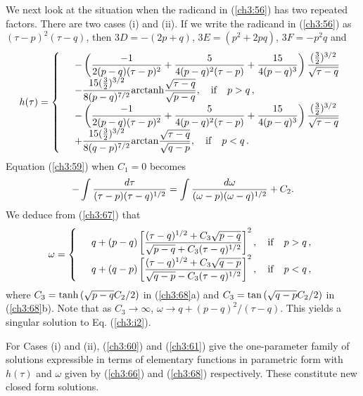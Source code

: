 We next look at the situation when the radicand in (\ref{ch3:56}) has two repeated factors. There are two
cases (i) and (ii). If we write the radicand in (\ref{ch3:56}) as $(\tau-p)^2(\tau-q)$, then $3D=-(2p+q)$,
$3E=(p^2+2pq)$, $3F=-p^2q$ and 
\begin{equation}\label{ch3:66}
h(\tau)=\left \{  \begin{array}{ll} 
&\displaystyle -\left({-1\over 2(p-q)(\tau-p)^2}+{5\over 4(p-q)^2(\tau-p)}+{15\over 4(p-q)^3}\right){(\frac32)^{3/2}\over
\sqrt{\tau-q}}\\
&- \displaystyle{15(\frac32)^{3/2}\over 8(p-q)^{7/2}}{\rm arctanh} {\sqrt{\tau-q}\over \sqrt{p-q}}, \quad {\rm if}\quad p>q\,,\\
&\displaystyle -\left({-1\over 2(p-q)(\tau-p)^2}+{5\over 4(p-q)^2(\tau-p)}+{15\over 4(p-q)^3}\right){(\frac32)^{3/2}\over
\sqrt{\tau-q}}\\
& +\displaystyle{15(\frac32)^{3/2}\over 8(q-p)^{7/2}}{\rm arctan} {\sqrt{\tau-q}\over \sqrt{q-p}}, \quad {\rm if}\quad p<q\,.
\end{array}\right.
\end{equation}
Equation (\ref{ch3:59}) when $C_1=0$ becomes
\begin{equation}
-\int {d\tau\over (\tau-p)(\tau-q)^{1/2}}=\int\displaystyle {d\omega\over (\omega-p)(\omega-q)^{1/2}}+C_2.\label{ch3:67}
\end{equation}
We deduce from (\ref{ch3:67}) that 
\begin{equation}\label{ch3:68}
\omega=\left \{  \begin{array}{ll}
&q+(p-q)\left[\displaystyle{(\tau-q)^{1/2}+C_3\sqrt{p-q}\over \sqrt{p-q}+C_3(\tau-q)^{1/2}}\right]^2, 
\quad {\rm if}\quad p>q\,,\\
&q+(q-p)\left[\displaystyle{(\tau-q)^{1/2}+C_3\sqrt{q-p}\over \sqrt{q-p}-C_3(\tau-q)^{1/2}}\right]^2, 
\quad {\rm if}\quad p<q\,,
\end{array}\right.
\end{equation}
where $C_3={\rm tanh}\,(\sqrt{p-q}C_2/2)$ in (\ref{ch3:68}a) and
$C_3={\rm tan}\,(\sqrt{q-p}C_2/2)$ in (\ref{ch3:68}b).
Note that as $C_3\rightarrow \infty$, $\omega\rightarrow q+(p-q)^2/(\tau-q)$.
This yields a singular solution to Eq. (\ref{ch3:i2}).

For Cases (i) and (ii), (\ref{ch3:60}) and (\ref{ch3:61}) give the one-parameter family of solutions expressible 
in terms of elementary functions in parametric form
with $h(\tau)$ and $\omega$ given by (\ref{ch3:66}) and (\ref{ch3:68}) respectively. These constitute new 
closed form solutions.

